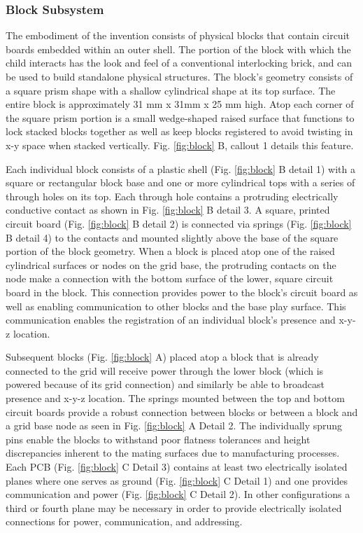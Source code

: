 \documentclass[]{article}
\begin{document}
\subsubsection{Block Subsystem}
The embodiment of the invention consists of physical blocks that contain circuit boards embedded within an outer shell. The portion of the block with which the child interacts has the look and feel of a conventional interlocking brick, and can be used to build standalone physical structures. The block’s geometry consists of a square prism shape with a shallow cylindrical shape at its top surface. The entire block is approximately 31 mm x 31mm x 25 mm high. Atop each corner of the square prism portion is a small wedge-shaped raised surface that functions to lock stacked blocks together as well as keep blocks registered to avoid twisting in x-y space when stacked vertically. Fig. \ref{fig:block} B, callout 1 details this feature.

Each individual block consists of a plastic shell (Fig. \ref{fig:block} B detail 1) with a square or rectangular block base and one or more cylindrical tops with a series of through holes on its top.  Each through hole contains a protruding electrically conductive contact as shown in Fig. \ref{fig:block} B detail 3. A square, printed circuit board (Fig. \ref{fig:block} B detail 2) is connected via springs (Fig. \ref{fig:block} B detail 4) to the contacts and mounted slightly above the base of the square portion of the block geometry. When a block is placed atop one of the raised cylindrical surfaces or nodes on the grid base, the protruding contacts on the node make a connection with the bottom surface of the lower, square circuit board in the block. This connection provides power to the block’s circuit board as well as enabling communication to other blocks and the base play surface. This communication enables the registration of an individual block’s presence and x-y-z location. 

Subsequent blocks (Fig. \ref{fig:block} A) placed atop a block that is already connected to the grid will receive power through the lower block (which is powered because of its grid connection) and similarly be able to broadcast presence and x-y-z location. The springs mounted between the top and bottom circuit boards provide a robust connection between blocks or between a block and a grid base node as seen in Fig. \ref{fig:block} A Detail 2.  The individually sprung pins  enable the blocks to withstand poor flatness tolerances and height discrepancies inherent to the mating surfaces due to manufacturing processes. Each PCB (Fig. \ref{fig:block} C Detail 3) contains at least two electrically isolated planes where one serves as ground (Fig. \ref{fig:block} C Detail 1) and one provides communication and power (Fig. \ref{fig:block} C Detail 2). In other configurations a third or fourth plane may be necessary in order to provide electrically isolated connections for power, communication, and addressing. 
\end{document}
